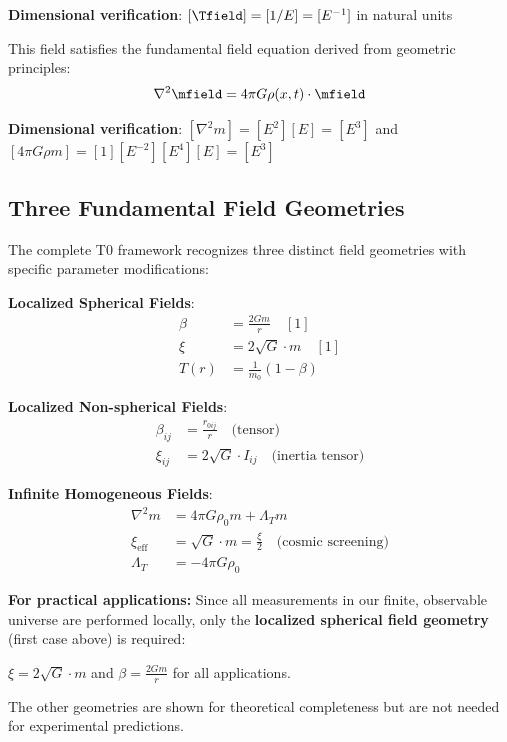 	\textbf{Dimensional verification}: $[\Tfield] = [1/E] = [E^{-1}]$ in natural units \checkmark
	
	This field satisfies the fundamental field equation derived from geometric principles:
	\begin{equation}
		\nabla^2 \mfield = 4\pi G \rho(x,t) \cdot \mfield
		\label{eq:field_equation}
	\end{equation}
	
	\textbf{Dimensional verification}: $[\nabla^2 m] = [E^2][E] = [E^3]$ and $[4\pi G \rho m] = [1][E^{-2}][E^4][E] = [E^3]$ \checkmark
	
	\subsection{Three Fundamental Field Geometries}
	\label{subsec:three_geometries}
	
	The complete T0 framework recognizes three distinct field geometries with specific parameter modifications:
	
	\begin{tcolorbox}[colback=blue!5!white,colframe=blue!75!black,title=T0 Model Parameter Framework]
		\textbf{Localized Spherical Fields}:
		\begin{align}
			\beta &= \frac{2Gm}{r} \quad [1] \\
			\xi &= 2\sqrt{G} \cdot m \quad [1] \\
			T(r) &= \frac{1}{m_0}(1 - \beta)
		\end{align}
		
		\textbf{Localized Non-spherical Fields}:
		\begin{align}
			\beta_{ij} &= \frac{r_{0ij}}{r} \quad \text{(tensor)} \\
			\xi_{ij} &= 2\sqrt{G} \cdot I_{ij} \quad \text{(inertia tensor)}
		\end{align}
		
		\textbf{Infinite Homogeneous Fields}:
		\begin{align}
			\nabla^2 m &= 4\pi G \rho_0 m + \Lambda_T m \\
			\xi_{\text{eff}} &= \sqrt{G} \cdot m = \frac{\xi}{2} \quad \text{(cosmic screening)} \\
			\Lambda_T &= -4\pi G \rho_0
		\end{align}
	\end{tcolorbox}
\begin{tcolorbox}[colback=yellow!5!white,colframe=orange!75!black,title=Practical Simplification Note]
	\textbf{For practical applications:} Since all measurements in our finite, observable universe are performed locally, only the \textbf{localized spherical field geometry} (first case above) is required:
	
	$\xi = 2\sqrt{G} \cdot m$ and $\beta = \frac{2Gm}{r}$ for all applications.
	
	The other geometries are shown for theoretical completeness but are not needed for experimental predictions.
\end{tcolorbox}	
